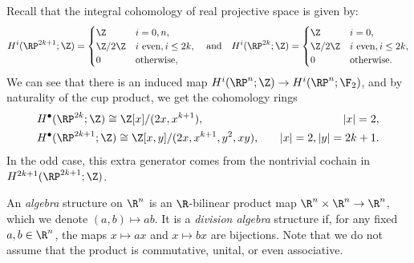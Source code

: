 \documentclass[11pt,letterpaper]{article}
\begin{document}
\begin{solution}
    \quad Recall that the integral cohomology of real projective space is given by:
    \[
        H^i(\RP^{2k+1}; \Z) = \begin{cases}
            \Z & i =0,n,\\
            \Z /2\Z & i\text{ even}, i \leq 2k,\\
            0 &\text{otherwise},
        \end{cases}
        \quad \text{and} \quad
        H^i(\RP^{2k}; \Z) = \begin{cases}
            \Z & i =0,\\
            \Z /2\Z & i\text{ even}, i \leq 2k,\\
            0 &\text{otherwise}.
        \end{cases}
    \] 
    We can see that there is an induced map $H^i(\RP^n; \Z) \to H^i(\RP^n; \F_2)$, and by naturality of the cup product, we get the cohomology rings
    \[
        \begin{aligned}
            &H^\bullet(\RP^{2k}; \Z) \cong \Z[x] / (2x, x^{k+1}),\quad &|x|=2,\\
            &H^\bullet(\RP^{2k+1}; \Z) \cong \Z[x,y] / (2x, x^{k+1}, y^2, xy),\quad  &|x|=2, |y|=2k+1.
        \end{aligned}
    \]
    In the odd case, this extra generator comes from the nontrivial cochain in $H^{2k+1}(\RP^{2k+1}; \Z)$.
\end{solution}

\begin{problem}
    An \emph{algebra} structure on $\R^n$ is an $\R$-bilinear product map $\R^n\times \R^n \to \R^n$, which we denote $(a,b)\mapsto ab$. It is a \emph{division algebra} structure if, for any fixed $a,b\in \R^n$, the maps $x\mapsto ax$ and $x\mapsto bx$ are bijections. Note that we do not assume that the product is commutative, unital, or even associative.
\end{problem}
\end{document}
